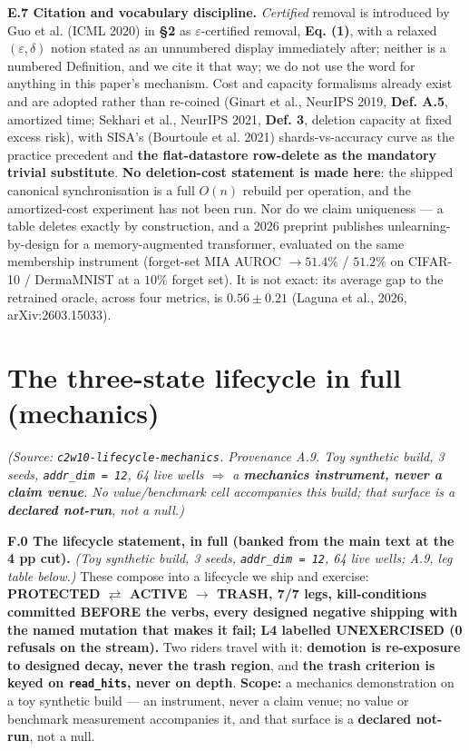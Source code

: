 \documentclass{article}
\begin{document}
\textbf{E.7 Citation and vocabulary discipline.} \emph{Certified} removal is introduced by Guo et al. (ICML 2020) in \textbf{\S 2} as $\varepsilon$-certified removal, \textbf{Eq. (1)}, with a relaxed $(\varepsilon,\delta)$ notion stated as an unnumbered display immediately after; neither is a numbered Definition, and we cite it that way; we do not use the word for anything in this paper's mechanism. Cost and capacity formalisms already exist and are adopted rather than re-coined (Ginart et al., NeurIPS 2019, \textbf{Def. A.5}, amortized time; Sekhari et al., NeurIPS 2021, \textbf{Def. 3}, deletion capacity at fixed excess risk), with SISA's (Bourtoule et al. 2021) shards-vs-accuracy curve as the practice precedent and \textbf{the flat-datastore row-delete as the mandatory trivial substitute}. \textbf{No deletion-cost statement is made here}: the shipped canonical synchronisation is a full $O(n)$ rebuild per operation, and the amortized-cost experiment has not been run. Nor do we claim uniqueness --- a table deletes exactly by construction, and a 2026 preprint publishes unlearning-by-design for a memory-augmented transformer, evaluated on the same membership instrument (forget-set MIA AUROC $\to51.4\%$ / $51.2\%$ on CIFAR-10 / DermaMNIST at a $10\%$ forget set). It is not exact: its average gap to the retrained oracle, across four metrics, is $0.56\pm0.21$ (Laguna et al., 2026, arXiv:2603.15033).

\section{The three-state lifecycle in full (mechanics)}

\emph{(Source: \texttt{c2w10-lifecycle-mechanics}. Provenance A.9. Toy synthetic build, 3 seeds, \texttt{addr\_dim = 12}, 64 live wells $\Rightarrow$ a \textbf{mechanics instrument, never a claim venue}. No value/benchmark cell accompanies this build; that surface is a \textbf{declared not-run}, not a null.)}

\textbf{F.0 The lifecycle statement, in full (banked from the main text at the 4 pp cut).} \emph{(Toy synthetic build, 3 seeds, \texttt{addr\_dim = 12}, 64 live wells; A.9, leg table below.)} These compose into a lifecycle we ship and exercise: \textbf{PROTECTED $\rightleftarrows$ ACTIVE $\to$ TRASH, 7/7 legs, kill-conditions committed BEFORE the verbs, every designed negative shipping with the named mutation that makes it fail; L4 labelled UNEXERCISED (0 refusals on the stream).} Two riders travel with it: \textbf{demotion is re-exposure to designed decay, never the trash region}, and \textbf{the trash criterion is keyed on \texttt{read\_hits}, never on depth}. \textbf{Scope:} a mechanics demonstration on a toy synthetic build --- an instrument, never a claim venue; no value or benchmark measurement accompanies it, and that surface is a \textbf{declared not-run}, not a null.
\end{document}
